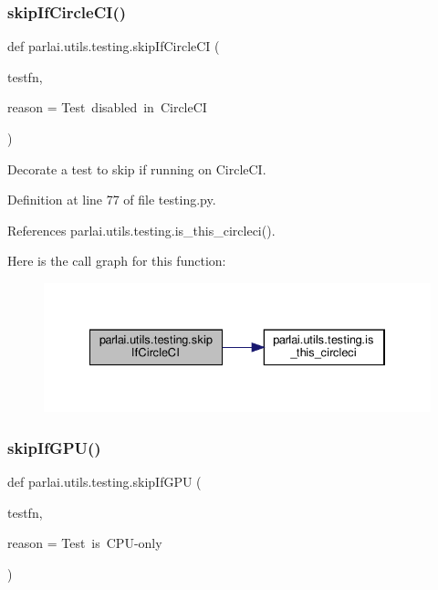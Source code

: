\subsubsection{\texorpdfstring{skip\+If\+Circle\+C\+I()}{skipIfCircleCI()}}
{\footnotesize\ttfamily def parlai.\+utils.\+testing.\+skip\+If\+Circle\+CI (\begin{DoxyParamCaption}\item[{}]{testfn,  }\item[{}]{reason = {\ttfamily \textquotesingle{}Test~disabled~in~CircleCI\textquotesingle{}} }\end{DoxyParamCaption})}

\begin{DoxyVerb}Decorate a test to skip if running on CircleCI.\end{DoxyVerb}
 

Definition at line 77 of file testing.\+py.



References parlai.\+utils.\+testing.\+is\+\_\+this\+\_\+circleci().

Here is the call graph for this function\+:
\nopagebreak
\begin{figure}[H]
\begin{center}
\leavevmode
\includegraphics[width=334pt]{namespaceparlai_1_1utils_1_1testing_a056ab7a9ad687500924a29001a7d9264_cgraph}
\end{center}
\end{figure}
\mbox{\label{namespaceparlai_1_1utils_1_1testing_a2d3bb5013e210bf866032aedc812859b}} 
\subsubsection{\texorpdfstring{skip\+If\+G\+P\+U()}{skipIfGPU()}}
{\footnotesize\ttfamily def parlai.\+utils.\+testing.\+skip\+If\+G\+PU (\begin{DoxyParamCaption}\item[{}]{testfn,  }\item[{}]{reason = {\ttfamily \textquotesingle{}Test~is~CPU-\/only\textquotesingle{}} }\end{DoxyParamCaption})}

